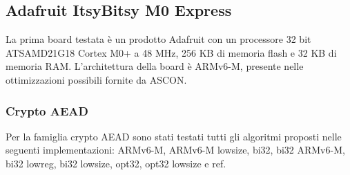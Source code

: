 \subsection{Adafruit ItsyBitsy M0 Express}

La prima board testata è un prodotto Adafruit con un processore 32 bit ATSAMD21G18 Cortex M0+ a 48 MHz, 256 KB di memoria flash e 32 KB di memoria RAM\cite{adafruit}. L'architettura della board è ARMv6-M, presente nelle ottimizzazioni possibili fornite da ASCON\cite{arm}.

\subsubsection{Crypto AEAD}

Per la famiglia crypto AEAD sono stati testati tutti gli algoritmi proposti nelle seguenti implementazioni: ARMv6-M, ARMv6-M lowsize, bi32, bi32 ARMv6-M, bi32 lowreg, bi32 lowsize, opt32, opt32 lowsize e ref.

